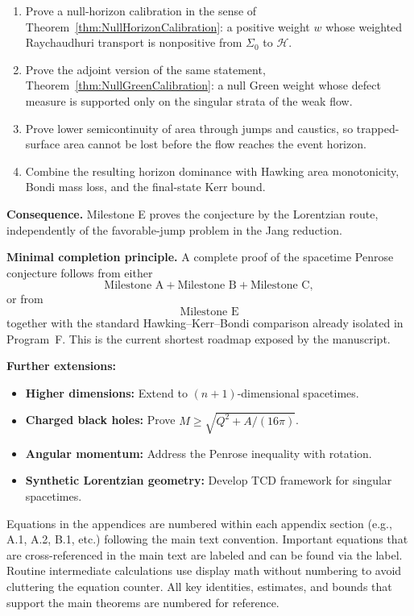 \begin{enumerate}
    \item Prove a null-horizon calibration in the sense of Theorem~\ref{thm:NullHorizonCalibration}: a positive weight $w$ whose weighted Raychaudhuri transport is nonpositive from $\Sigma_0$ to $\mathcal H$.
    \item Prove the adjoint version of the same statement, Theorem~\ref{thm:NullGreenCalibration}: a null Green weight whose defect measure is supported only on the singular strata of the weak flow.
    \item Prove lower semicontinuity of area through jumps and caustics, so trapped-surface area cannot be lost before the flow reaches the event horizon.
    \item Combine the resulting horizon dominance with Hawking area monotonicity, Bondi mass loss, and the final-state Kerr bound.
\end{enumerate}

\textbf{Consequence.} Milestone E proves the conjecture by the Lorentzian route, independently of the favorable-jump problem in the Jang reduction.

\textbf{Minimal completion principle.} A complete proof of the spacetime Penrose conjecture follows from either
\[
    \text{Milestone A}+\text{Milestone B}+\text{Milestone C},
\]
or from
\[
    \text{Milestone E}
\]
together with the standard Hawking--Kerr--Bondi comparison already isolated in Program~F. This is the current shortest roadmap exposed by the manuscript.

\textbf{Further extensions:}
\begin{itemize}
    \item \textbf{Higher dimensions:} Extend to $(n+1)$-dimensional spacetimes.
    \item \textbf{Charged black holes:} Prove $M \ge \sqrt{Q^2 + A/(16\pi)}$.
    \item \textbf{Angular momentum:} Address the Penrose inequality with rotation.
    \item \textbf{Synthetic Lorentzian geometry:} Develop TCD framework for singular spacetimes.
\end{itemize}

\appendix

\begin{remark}
Equations in the appendices are numbered within each appendix section (e.g., A.1, A.2, B.1, etc.) following the main text convention. Important equations that are cross-referenced in the main text are labeled and can be found via the label. Routine intermediate calculations use display math without numbering to avoid cluttering the equation counter. All key identities, estimates, and bounds that support the main theorems are numbered for reference.
\end{remark}

